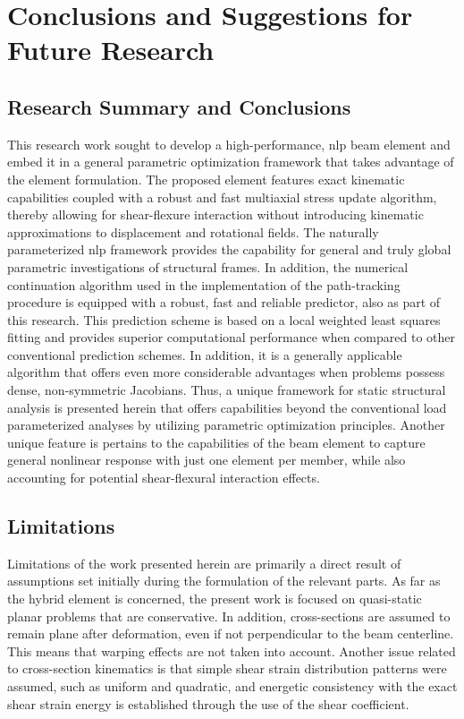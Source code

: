 \chapter{Conclusions and Suggestions for Future Research}

\section{Research Summary and Conclusions}
This research work sought to develop a high-performance, \acrshort{nlp} beam 
element 
and embed it in a general parametric optimization framework that takes 
advantage of 
the element formulation. The proposed element features exact kinematic 
capabilities 
coupled with a robust and fast multiaxial stress update algorithm, thereby 
allowing 
for shear-flexure interaction without introducing kinematic approximations to 
displacement and rotational fields. The naturally parameterized \acrshort{nlp} 
framework provides the capability for general and truly global parametric 
investigations of structural frames. In addition, the numerical continuation 
algorithm 
used in the implementation of the path-tracking procedure is equipped with a 
robust, 
fast and reliable predictor, also as part of this research. This prediction 
scheme is 
based on a local weighted least squares fitting and provides superior 
computational 
performance when compared to other conventional prediction schemes. In 
addition, it is 
a generally applicable algorithm that offers even more considerable advantages 
when 
problems possess dense, non-symmetric Jacobians. Thus, a unique framework for 
static structural analysis is presented herein that offers capabilities beyond 
the conventional load parameterized analyses by utilizing parametric 
optimization principles. Another unique feature is pertains to the capabilities 
of the beam element to capture general nonlinear response with just one element 
per member, while also accounting for potential shear-flexural interaction 
effects.

\section{Limitations}

Limitations of the work presented herein are primarily a direct 
result of 
assumptions set initially during the formulation of the relevant parts. As far 
as the 
hybrid element is concerned, the present work is focused on quasi-static planar 
problems that are conservative. In addition, cross-sections are assumed to 
remain 
plane after deformation, even if not perpendicular to the beam centerline. This 
means 
that warping effects are not taken into account. Another issue related to 
cross-section 
kinematics is that simple shear strain 
distribution 
patterns 
were assumed, such as uniform and quadratic, and energetic consistency with the 
exact 
shear strain energy is established through the use of the shear coefficient.

